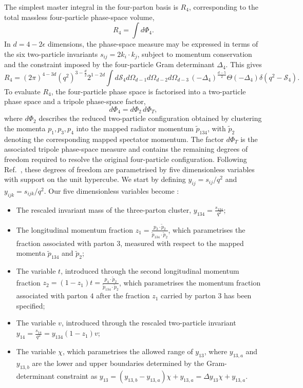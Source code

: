The simplest master integral in the four-parton basis is $R_4$, corresponding to the total
massless four-particle phase-space volume,
\begin{equation*}
    R_4=\int d\Phi_4.
\end{equation*}
In $d=4-2\epsilon$ dimensions, the phase-space measure may be expressed in terms of the six
two-particle invariants $s_{ij}=2k_i\cdot k_j$, subject to momentum conservation and the
constraint imposed by the four-particle Gram determinant $\Delta_4$. This gives
\begin{equation}
    R_4 = (2\pi)^{4-3d}\!\left(q^2\right)^{3-\frac d2}2^{1-2d}\int d\mathcal S_4d\Omega_{d-1}d\Omega_{d-2}d\Omega_{d-3}\,(-\Delta_4)^{\frac{d-5}{2}}\Theta(-\Delta_4)\delta\!\left(q^2-\mathcal S_4\right).
\end{equation}
To evaluate $R_4$, the four-particle phase space is factorised into a two-particle phase space
and a tripole phase-space factor,
\begin{equation*}
    d\Phi_4=d\Phi_2\,d\Phi_T,
\end{equation*}
where $d\Phi_2$ describes the reduced two-particle configuration obtained by clustering the
momenta $p_1,p_3,p_4$ into the mapped radiator momentum $\tilde p_{134}$, with $\tilde p_2$
denoting the corresponding mapped spectator momentum. The factor $d\Phi_T$ is the associated
tripole phase-space measure and contains the remaining degrees of freedom required to resolve
the original four-particle configuration. Following Ref.~\cite{GehrmannDeRidder0311276}, these
degrees of freedom are parametrised by five dimensionless variables with support on the unit
hypercube. We start by defining $y_{ij} = s_{ij}/q^2$ and $y_{ijk} = s_{ijk}/q^2$. Our five
dimensionless variables become \cite{GehrmannDeRidder0311276}:
\begin{itemize}
    \item The rescaled invariant mass of the three-parton cluster, $y_{134} = \frac{s_{134}}{q^2}$;
    \item The longitudinal momentum fraction $z_1 = \frac{p_3\cdot\tilde p_2}{\tilde p_{134}\cdot\tilde p_2}$, which parametrises the fraction associated with parton $3$, measured with respect to the mapped momenta $\tilde p_{134}$ and $\tilde p_2$;
    \item The variable $t$, introduced through the second longitudinal momentum fraction $z_2 = (1-z_1)t = \frac{p_4\cdot\tilde p_2}{\tilde p_{134}\cdot\tilde p_2}$, which parametrises the momentum fraction associated with parton $4$ after the fraction $z_1$ carried by parton $3$ has been specified;
    \item The variable $v$, introduced through the rescaled two-particle invariant $y_{14}=\frac{s_{14}}{q^2} = y_{134}(1-z_1)v$;
    \item The variable $\chi$, which parametrises the allowed range of $y_{13}$, where $y_{13,a}$ and $y_{13,b}$ are the lower and upper boundaries determined by the Gram-determinant constraint as $y_{13} = (y_{13,b}-y_{13,a})\chi+y_{13,a}= \Delta y_{13}\chi+y_{13,a}$.
\end{itemize}
